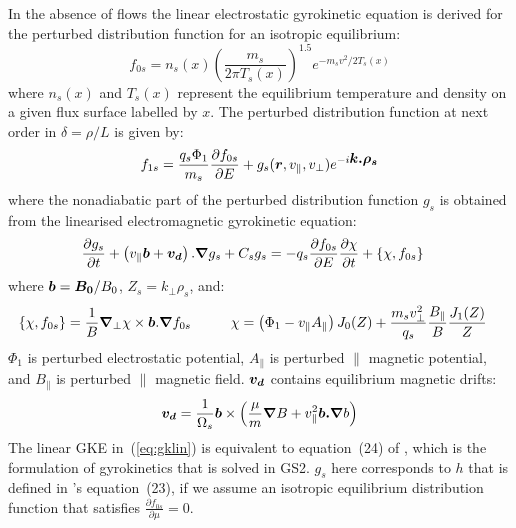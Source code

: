 \documentclass[10pt,a4paper]{article}
\newcommand{\grad}{{\bfm \nabla}}
\newcommand{\pd}[2]{\frac{\partial{#1}}{\partial{#2}} }
\newcommand{\bfm}[1]{\mbox{{\boldmath $ { #1}$}}}
\begin{document}
In the absence of flows the linear electrostatic gyrokinetic equation is
derived for the perturbed distribution function for an isotropic equilibrium:
\[ f_{0s} = n_s(x) \left(\frac{m_s}{2\pi T_s(x)}\right)^{1.5} e^{-m_s
  v^2/2T_s(x)}
\]
where $n_s(x)$ and $T_s(x)$ represent the equilibrium temperature and density
on a given flux surface labelled by $x$. The perturbed distribution function
at next order in $\delta= \rho/L$ is given by:
\begin{equation}
f_{1s} = \frac{q_s \Phi_1}{m_s} \pd{f_{0s}}{E} +
g_s(\bfm{r},v_{\parallel},v_{\perp}) e^{-i\bfm{k.\rho_s}} \label{eq:f1}
\end{equation}
where the nonadiabatic part of the perturbed distribution function $g_s$ is
obtained from the linearised electromagnetic gyrokinetic equation:
\begin{align}
\frac{\partial g_s}{\partial t} + \left( v_{\parallel} \bfm{b} + \bfm{v_d}
\right). \grad{g_s} +C_s g_s & =  -q_s \pd{f_{0s}}{E} \pd{\chi}{t} +  \left\{
  \chi, f_{0s}\right\} \label{eq:gklin}
\end{align}
where $\bfm{b}=\bfm{B_0}/B_0$, $Z_s=k_{\perp} \rho_s$, and:
\begin{align*}
\{ \chi,f_{0s} \} = \frac{1}{B} \grad_{\perp} \chi \times \bfm{b}
.\grad{f_{0s}} \hspace*{1cm}& \chi = \left( \Phi_1 - v_{\parallel}
  A_{\parallel} \right) J_0(Z) + \frac{m_s v_{\perp}^2}{q_s}
\frac{B_{\parallel}}{B} \frac{J_1(Z)}{Z} 
\end{align*}
$\Phi_1$ is perturbed electrostatic potential, $A_{\parallel}$ is perturbed
$\parallel$ magnetic potential, and $B_{\parallel}$ is perturbed $\parallel$
magnetic field.  $\bfm{v_d}$ contains equilibrium magnetic drifts:
\begin{align*}
 \bfm{v_d} = \frac{1}{\Omega_s} \bfm{b} \times
\left( \frac{\mu}{m} \grad{B} + v_{\parallel}^2 \bfm{b.}\grad{b} \right)
\end{align*}
The linear GKE in~(\ref{eq:gklin}) is equivalent to equation~(24) of
\cite{antonsen_PF1980}, which is the formulation of gyrokinetics that is
solved in GS2.  $g_s$ here corresponds to $h$ that is defined in
\cite{antonsen_PF1980}'s equation~(23), if we assume an isotropic equilibrium
distribution function that satisfies $\pd{f_{0s}}{\mu}=0$.
\end{document}
